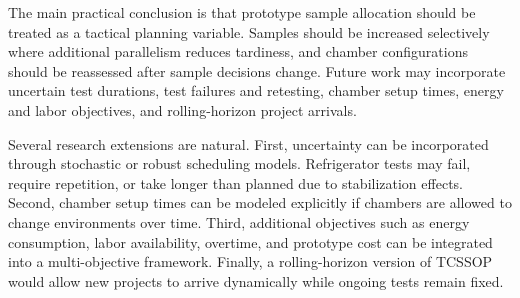 \documentclass[11pt]{article}
\begin{document}
The main practical conclusion is that prototype sample allocation should be treated as a tactical planning variable. Samples should be increased selectively where additional parallelism reduces tardiness, and chamber configurations should be reassessed after sample decisions change. Future work may incorporate uncertain test durations, test failures and retesting, chamber setup times, energy and labor objectives, and rolling-horizon project arrivals.

Several research extensions are natural. First, uncertainty can be incorporated through stochastic or robust scheduling models. Refrigerator tests may fail, require repetition, or take longer than planned due to stabilization effects. Second, chamber setup times can be modeled explicitly if chambers are allowed to change environments over time. Third, additional objectives such as energy consumption, labor availability, overtime, and prototype cost can be integrated into a multi-objective framework. Finally, a rolling-horizon version of TCSSOP would allow new projects to arrive dynamically while ongoing tests remain fixed.
\end{document}
